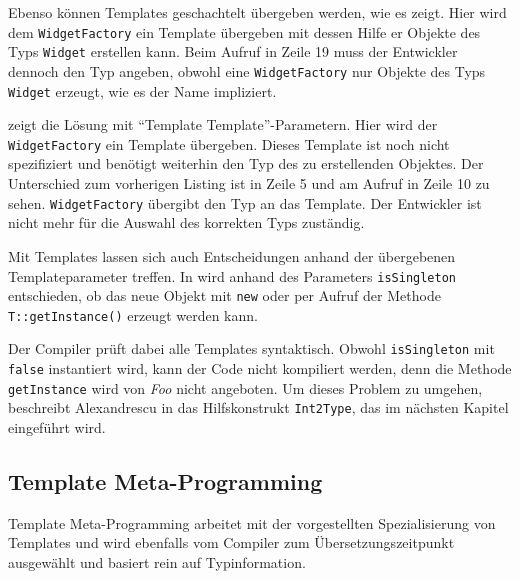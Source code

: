 

Ebenso können Templates geschachtelt übergeben werden, wie es  zeigt. Hier wird dem \texttt{WidgetFactory} ein Template übergeben mit dessen Hilfe er Objekte des Typs \texttt{Widget} erstellen kann. Beim Aufruf in Zeile 19 muss der Entwickler dennoch den Typ angeben, obwohl eine \texttt{WidgetFactory} nur Objekte des Typs \texttt{Widget} erzeugt, wie es der Name impliziert.



 zeigt die Lösung mit \enquote{Template Template}-Parametern. Hier wird der \texttt{WidgetFactory} ein Template übergeben. Dieses Template ist noch nicht spezifiziert und benötigt weiterhin den Typ des zu erstellenden Objektes. Der Unterschied zum vorherigen Listing ist in Zeile 5 und am Aufruf in Zeile 10 zu sehen. \texttt{WidgetFactory} übergibt den Typ an das Template. Der Entwickler ist nicht mehr für die Auswahl des korrekten Typs zuständig.



Mit Templates lassen sich auch Entscheidungen anhand der übergebenen Templateparameter treffen. In  wird anhand des Parameters \texttt{isSingleton} entschieden, ob das neue Objekt mit \texttt{new} oder per Aufruf der Methode \texttt{T::getInstance()} erzeugt werden kann.



Der Compiler prüft dabei alle Templates syntaktisch. Obwohl \texttt{isSingleton} mit \texttt{false} instantiert wird, kann der Code nicht kompiliert werden, denn die Methode \texttt{getInstance} wird von \emph{Foo} nicht angeboten. Um dieses Problem zu umgehen, beschreibt Alexandrescu in \cite{Alexandrescu2001Modern} das Hilfskonstrukt \texttt{Int2Type}, das im nächsten Kapitel eingeführt wird.

\subsection{Template Meta-Programming}
Template Meta-Programming arbeitet mit der vorgestellten Spezialisierung von Templates und wird ebenfalls vom Compiler zum Übersetzungszeitpunkt ausgewählt und basiert rein auf Typinformation.

